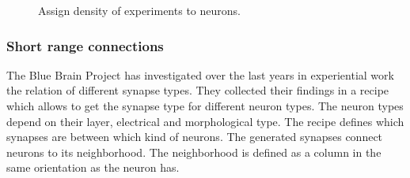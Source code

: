 \documentclass[a4paper]{article}
\begin{document}
\begin{figure}[ht!]
   	\begin{center}
        \hspace{0.5cm}
       \hspace{0.5cm}
        \hspace{0.5cm}
    \end{center}
    	\caption{%
        Assign density of experiments to neurons.
     }%
   \label{fig:atlas}
   \end{figure}
   
\subsubsection{Short range connections}
The Blue Brain Project has investigated over the last years in experiential work the relation of different synapse types.
They collected their findings in a recipe which allows to get the synapse type for different neuron types.
The neuron types depend on their layer, electrical and morphological type. The recipe defines which synapses are between 
which kind of neurons. The generated synapses connect neurons to its neighborhood. The neighborhood is defined as a
column in the same orientation as the neuron has.
\end{document}

